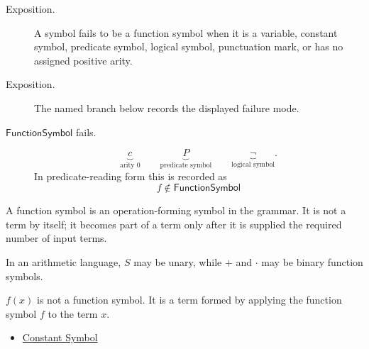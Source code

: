 \begin{remark*}
\begin{description}
  \item[Exposition.] A symbol fails to be a function symbol when it is a variable, constant symbol,
predicate symbol, logical symbol, punctuation mark, or has no assigned positive
arity.
\end{description}
\end{remark*}

\begin{remark*}
\begin{description}
  \item[Exposition.] The named branch below records the displayed failure mode.
\item[\(\mathsf{FunctionSymbol}\) fails.] \[
\underbrace{c}_{\text{arity }0}
\qquad
\underbrace{P}_{\text{predicate symbol}}
\qquad
\underbrace{\neg}_{\text{logical symbol}}.
\]
  In predicate-reading form this is recorded as
  \[
    f\notin\mathsf{FunctionSymbol}
  \]
\end{description}
\end{remark*}

\begin{remark*}[Interpretation]
A function symbol is an operation-forming symbol in the grammar. It is not a
term by itself; it becomes part of a term only after it is supplied the required
number of input terms.
\end{remark*}

\begin{remark*}[Examples]
In an arithmetic language, \(S\) may be unary, while \(+\) and \(\cdot\) may be
binary function symbols.
\end{remark*}

\begin{remark*}
\(f(x)\) is not a function symbol. It is a term formed by applying the function
symbol \(f\) to the term \(x\).
\end{remark*}

\begin{dependencies}
\begin{itemize}
  \item \hyperref[def:constant-symbol]{Constant Symbol}
\end{itemize}
\end{dependencies}

